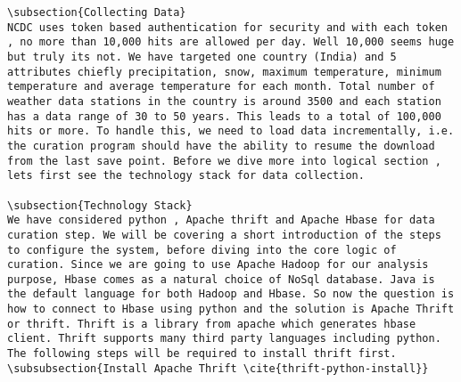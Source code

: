 \documentclass[9pt,twocolumn,twoside]{../../styles/osajnl}
\begin{document}
\begin{verbatim}
\subsection{Collecting Data}
NCDC uses token based authentication for security and with each token , no more than 10,000 hits are allowed per day. Well 10,000 seems huge but truly its not. We have targeted one country (India) and 5 attributes chiefly precipitation, snow, maximum temperature, minimum temperature and average temperature for each month. Total number of weather data stations in the country is around 3500 and each station has a data range of 30 to 50 years. This leads to a total of 100,000 hits or more. To handle this, we need to load data incrementally, i.e. the curation program should have the ability to resume the download from the last save point. Before we dive more into logical section , lets first see the technology stack for data collection.

\subsection{Technology Stack}
We have considered python , Apache thrift and Apache Hbase for data curation step. We will be covering a short introduction of the steps to configure the system, before diving into the core logic of curation. Since we are going to use Apache Hadoop for our analysis purpose, Hbase comes as a natural choice of NoSql database. Java is the default language for both Hadoop and Hbase. So now the question is how to connect to Hbase using python and the solution is Apache Thrift or thrift. Thrift is a library from apache which generates hbase client. Thrift supports many third party languages including python. The following steps will be required to install thrift first.
\subsubsection{Install Apache Thrift \cite{thrift-python-install}}


\end{verbatim}
\end{document}
